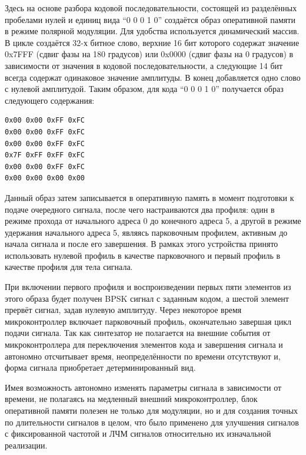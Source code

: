 \documentclass[rusmathsym, eqnumwithinsec, amspack, hyperref]{bomgost}
\begin{document}
Здесь на основе разбора кодовой последовательности, состоящей из разделённых пробелами нулей и единиц вида ``0 0 0 1 0'' создаётся образ оперативной памяти в режиме полярной модуляции. Для удобства используется динамический массив. В цикле создаётся 32-х битное слово, верхние 16 бит которого содержат значение 0x7FFF (сдвиг фазы на 180 градусов) или 0x0000 (сдвиг фазы на 0 градусов) в зависимости от значения в кодовой последовательности, а следующие 14 бит всегда содержат одинаковое значение амплитуды. В конец добавляется одно слово с нулевой амплитудой. Таким образом, для кода ``0 0 0 1 0'' получается образ следующего содержания:

\lstset{
	language=c,
	basicstyle=\scriptsize\ttfamily,
	numbers=left,
	stepnumber=1,
	showstringspaces=false,
	tabsize=4,
	breaklines=true,
	breakatwhitespace=false,
	xleftmargin=.1\textwidth, xrightmargin=.1\textwidth,
	belowskip=1em, aboveskip=1em
}
\begin{lstlisting}[firstnumber=0]
0x00 0x00 0xFF 0xFC
0x00 0x00 0xFF 0xFC
0x00 0x00 0xFF 0xFC
0x7F 0xFF 0xFF 0xFC
0x00 0x00 0xFF 0xFC
0x00 0x00 0x00 0x00
\end{lstlisting}

Данный образ затем записывается в оперативную память в момент подготовки к подаче очередного сигнала, после чего настраиваются два профиля: один в режиме прохода от начального адреса 0 до конечного адреса 5, а другой в режиме удержания начального адреса 5, являясь парковочным профилем, активным до начала сигнала и после его завершения. В рамках этого устройства принято использовать нулевой профиль в качестве парковочного и первый профиль в качестве профиля для тела сигнала.

При включении первого профиля и воспроизведении первых пяти элементов из этого образа будет получен BPSK сигнал с заданным кодом, а шестой элемент прервёт сигнал, задав нулевую амплитуду. Через некоторое время микроконтроллер включает парковочный профиль, окончательно завершая цикл подачи сигнала. Так как синтезатор не полагается на внешние события от микроконтроллера для переключения элементов кода и завершения сигнала и автономно отсчитывает время, неопределённости по времени отсутствуют и, форма сигнала приобретает детерминированный вид.


Имея возможность автономно изменять параметры сигнала в зависимости от времени, не полагаясь на медленный внешний микроконтроллер, блок оперативной памяти полезен не только для модуляции, но и для создания точных по длительности сигналов в целом, что было применено для улучшения сигналов с фиксированной частотой и ЛЧМ сигналов относительно их изначальной реализации.
\end{document}
